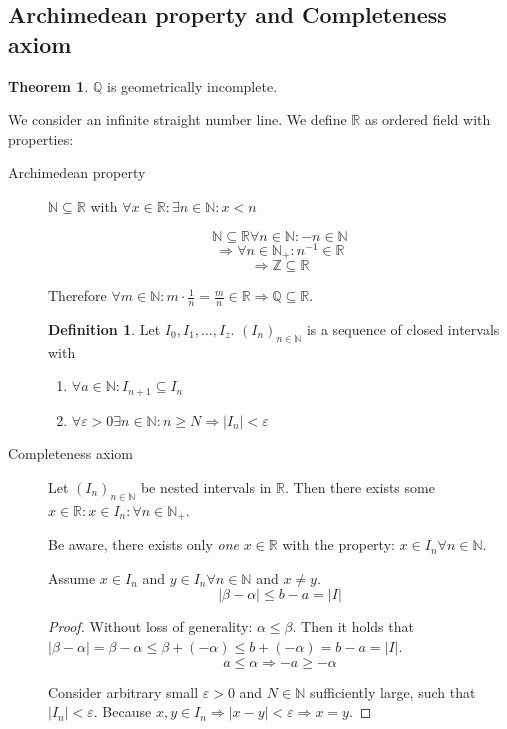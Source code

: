 \documentclass[a4paper,landscape,twocolumn]{article}
\theoremstyle{definition}
\newtheorem{theorem}{Theorem}
\newtheorem{defi}{Definition}
\newcommand\abs[1]{\left|#1\right|}
\begin{document}
\subsection{Archimedean property and Completeness axiom}
\begin{theorem}
  $\mathbb Q$ is geometrically incomplete.

  We consider an infinite straight number line.
  We define $\mathbb R$ as ordered field with properties:
  \begin{description}
    \item[Archimedean property]
      $\mathbb N \subseteq \mathbb R$ with $\forall x \in \mathbb R: \exists n \in \mathbb N: x < n$

      \[ \mathbb N \subseteq \mathbb R \forall n \in \mathbb N: -n \in \mathbb N \]
      \[ \Rightarrow \forall n \in \mathbb N_+: n^{-1} \in \mathbb R \]
      \[ \Rightarrow \mathbb Z \subseteq \mathbb R \]

      Therefore $\forall m \in \mathbb N: m \cdot \frac1n = \frac mn \in \mathbb R
      \Rightarrow \mathbb Q \subseteq \mathbb R$.

      \begin{defi}
        Let $I_0, I_1, \dots, I_z$. $(I_n)_{n \in \mathbb N}$ is a sequence of closed intervals with
        \begin{enumerate}
          \item $\forall a \in \mathbb N: I_{n+1} \subseteq I_n$
          \item $\forall \varepsilon > 0 \exists n \in \mathbb N: n \geq N \Rightarrow \abs{I_n} < \varepsilon$
        \end{enumerate}
      \end{defi}

    \item[Completeness axiom]
      Let $(I_n)_{n \in \mathbb N}$ be nested intervals in $\mathbb R$.
      Then there exists some $x \in \mathbb R: x \in I_n: \forall n \in \mathbb N_+$.

      Be aware, there exists only \emph{one} $x \in \mathbb R$ with the property:
      $x \in I_n \forall n \in \mathbb N$.

      Assume $x \in I_n$ and $y \in I_n \forall n \in \mathbb N$ and $x \neq y$.
      \[ \abs{\beta - \alpha} \leq b - a = \abs{I} \]

      \begin{proof}
        Without loss of generality: $\alpha \leq \beta$.
        Then it holds that $\abs{\beta - \alpha} = \beta - \alpha \leq \beta
        + (-\alpha) \leq b + (-\alpha) = b - a = \abs{I}$.
        \[ a \leq \alpha \Rightarrow -a \geq -\alpha \]

        Consider arbitrary small $\varepsilon > 0$ and $N \in \mathbb N$ sufficiently large,
        such that $\abs{I_n} < \varepsilon$. Because $x,y \in I_n \Rightarrow
        \abs{x - y} < \varepsilon \Rightarrow x = y$.
      \end{proof}
  \end{description}
\end{theorem}
\end{document}
